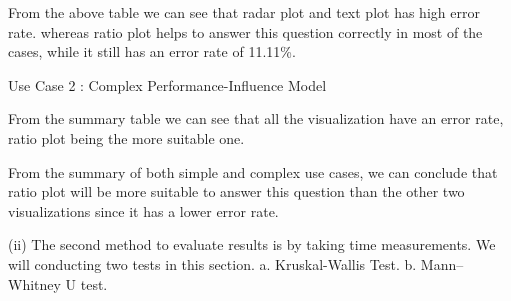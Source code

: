 From the above table we can see that radar plot and text plot has high error rate. whereas ratio plot helps to answer this question correctly in most of the cases, while it still has an error rate of 11.11\%.

Use Case 2 : Complex Performance-Influence Model



From the summary table we can see that all the visualization have an error rate, ratio plot being the more suitable one.

From the summary of both simple and complex use cases, we can conclude that ratio plot will be more suitable to answer this question than the other two visualizations since it has a lower error rate.

(ii) The second method to evaluate results is by taking time measurements.
We will conducting two tests in this section.
 a. Kruskal-Wallis Test.
 b. Mann–Whitney U test.

